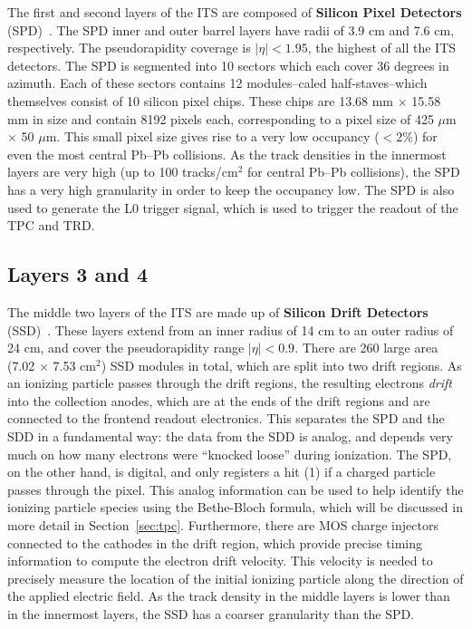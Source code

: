 The first and second layers of the ITS are composed of \textbf{Silicon Pixel Detectors} (SPD)~\cite{ITSSPD}. The SPD inner and outer barrel layers have radii of 3.9 cm and 7.6 cm, respectively. The pseudorapidity coverage is $|\eta| < 1.95$, the highest of all the ITS detectors. The SPD is segmented into 10 sectors which each cover 36 degrees in azimuth. Each of these sectors contains 12 modules--caled half-staves--which themselves consist of 10 silicon pixel chips. These chips are 13.68 mm $\times$ 15.58 mm in size and contain 8192 pixels each, corresponding to a pixel size of 425 $\mu$m $\times$ 50 $\mu$m. This small pixel size gives rise to a very low occupancy ($<2$\%) for even the most central Pb--Pb collisions.  As the track densities in the innermost layers are very high (up to 100 tracks/cm$^2$ for central Pb--Pb collisions), the SPD has a very high granularity in order to keep the occupancy low. The SPD is also used to generate the L0 trigger signal, which is used to trigger the readout of the TPC and TRD.

\subsection{Layers 3 and 4}
The middle two layers of the ITS are made up of \textbf{Silicon Drift Detectors} (SSD)~\cite{SSD}. These layers extend from an inner radius of 14 cm to an outer radius of 24 cm, and cover the pseudorapidity range $|\eta| < 0.9$. There are 260 large area (7.02 $\times$ 7.53 cm$^2$) SSD modules in total, which are split into two drift regions. As an ionizing particle passes through the drift regions, the resulting electrons \textit{drift} into the collection anodes, which are at the ends of the drift regions and are connected to the frontend readout electronics. This separates the SPD and the SDD in a fundamental way: the data from the SDD is analog, and depends very much on how many electrons were ``knocked loose'' during ionization. The SPD, on the other hand, is digital, and only registers a hit (1) if a charged particle passes through the pixel. This analog information can be used to help identify the ionizing particle species using the Bethe-Bloch formula, which will be discussed in more detail in Section~\ref{sec:tpc}. Furthermore, there are MOS charge injectors~\cite{MOSCharge} connected to the cathodes in the drift region, which provide precise timing information to compute the electron drift velocity. This velocity is needed to precisely measure the location of the initial ionizing particle along the direction of the applied electric field. As the track density in the middle layers is lower than in the innermost layers, the SSD has a coarser granularity than the SPD.

